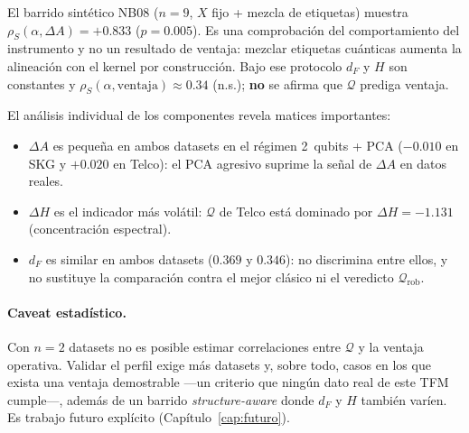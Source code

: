 El barrido sintético NB08 ($n=9$, $X$ fijo + mezcla de etiquetas) muestra $\rho_S(\alpha,\Delta A)=+0.833$ ($p=0.005$). Es una comprobación del comportamiento del instrumento y no un resultado de ventaja: mezclar etiquetas cuánticas aumenta la alineación con el kernel por construcción. Bajo ese protocolo $d_F$ y $H$ son constantes y $\rho_S(\alpha,\mathrm{ventaja})\approx 0.34$ (n.s.); \textbf{no} se afirma que $\mathcal{Q}$ prediga ventaja.

El análisis individual de los componentes revela matices importantes:
\begin{itemize}
    \item $\Delta A$ es pequeña en ambos datasets en el régimen 2~qubits + PCA ($-0.010$ en SKG y $+0.020$ en Telco): el PCA agresivo suprime la señal de $\Delta A$ en datos reales.
    \item $\Delta H$ es el indicador más volátil: $\mathcal{Q}$ de Telco está dominado por $\Delta H=-1.131$ (concentración espectral).
    \item $d_F$ es similar en ambos datasets ($0.369$ y $0.346$): no discrimina entre ellos, y no sustituye la comparación contra el mejor clásico ni el veredicto $\mathcal{Q}_{\mathrm{rob}}$.
\end{itemize}

\paragraph{Caveat estadístico.}
Con $n=2$ datasets no es posible estimar correlaciones entre $\mathcal{Q}$ y la ventaja operativa. Validar el perfil exige más datasets y, sobre todo, casos en los que exista una ventaja demostrable ---un criterio que ningún dato real de este TFM cumple---, además de un barrido \emph{structure-aware} donde $d_F$ y $H$ también varíen. Es trabajo futuro explícito (Capítulo~\ref{cap:futuro}).

